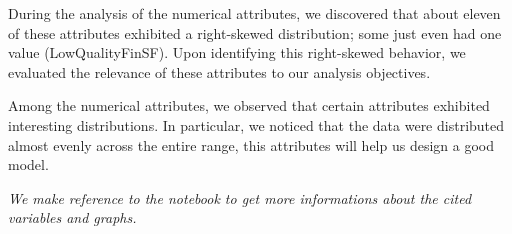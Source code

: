During the analysis of the numerical attributes, we discovered that about eleven of these attributes exhibited a right-skewed distribution; some just even had one value (LowQualityFinSF). Upon identifying this right-skewed behavior, we evaluated the relevance of these attributes to our analysis objectives. 

Among the numerical attributes, we observed that certain attributes exhibited interesting distributions. 
In particular, we noticed that the data were distributed almost evenly across the entire range, this attributes will help us design a good model.

% 

\emph{We make reference to the notebook to get more informations about the cited variables and graphs.}